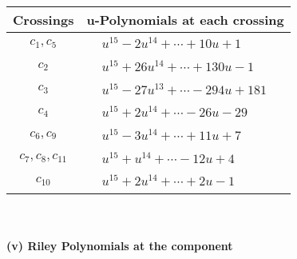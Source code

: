 \documentclass[1p]{elsarticle_modified}
\theoremstyle{definition}
\begin{document}
\begin{tabular}{m{50pt}|m{274pt}}
Crossings & \hspace{64pt}u-Polynomials at each crossing \\
\hline $$\begin{aligned}c_{1},c_{5}\end{aligned}$$&$\begin{aligned}
&u^{15}-2 u^{14}+\cdots+10 u+1
\end{aligned}$\\
\hline $$\begin{aligned}c_{2}\end{aligned}$$&$\begin{aligned}
&u^{15}+26 u^{14}+\cdots+130 u-1
\end{aligned}$\\
\hline $$\begin{aligned}c_{3}\end{aligned}$$&$\begin{aligned}
&u^{15}-27 u^{13}+\cdots-294 u+181
\end{aligned}$\\
\hline $$\begin{aligned}c_{4}\end{aligned}$$&$\begin{aligned}
&u^{15}+2 u^{14}+\cdots-26 u-29
\end{aligned}$\\
\hline $$\begin{aligned}c_{6},c_{9}\end{aligned}$$&$\begin{aligned}
&u^{15}-3 u^{14}+\cdots+11 u+7
\end{aligned}$\\
\hline $$\begin{aligned}c_{7},c_{8},c_{11}\end{aligned}$$&$\begin{aligned}
&u^{15}+u^{14}+\cdots-12 u+4
\end{aligned}$\\
\hline $$\begin{aligned}c_{10}\end{aligned}$$&$\begin{aligned}
&u^{15}+2 u^{14}+\cdots+2 u-1
\end{aligned}$\\
\hline
\end{tabular}\\~\\
\newpage\renewcommand{\arraystretch}{1}
\flushleft \textbf{(v) Riley Polynomials at the component}\newline \\
\end{document}
